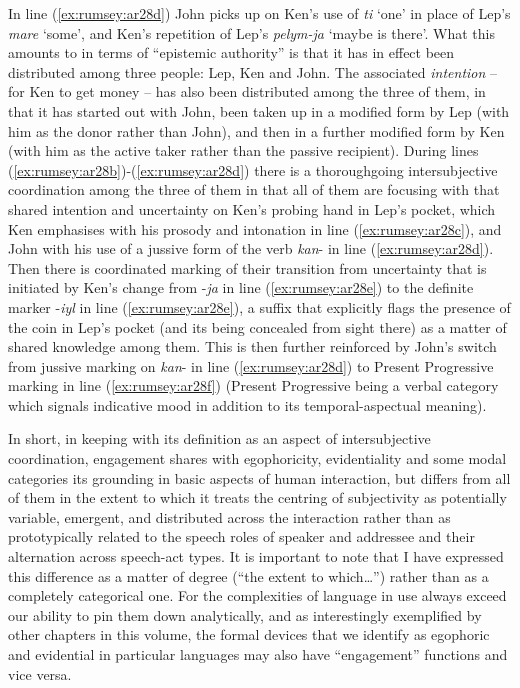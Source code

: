 \documentclass[output=paper]{langsci/langscibook}
\begin{document}
In line (\ref{ex:rumsey:ar28d}) John picks up on Ken’s use of \textit{ti} ‘one’ in place of Lep’s \textit{mare} ‘some’, and Ken’s repetition of Lep’s \textit{pelym-ja} ‘maybe is there’. What this amounts to in terms of “epistemic authority” is that it has in effect been distributed among three people:  Lep, Ken and John. The associated \textit{intention}  – for Ken to get money – has also been distributed among the three of them, in that it has started out with John, been taken up in a modified form by Lep (with him as the donor rather than John), and then in a further modified form by Ken (with him as the active taker rather than the passive recipient). During lines (\ref{ex:rumsey:ar28b})-(\ref{ex:rumsey:ar28d}) there is a thoroughgoing  intersubjective coordination among the three of them in that all of them are focusing with that shared intention and uncertainty on Ken’s probing hand in Lep’s pocket, which Ken emphasises with his prosody and intonation in line (\ref{ex:rumsey:ar28c}), and John with his use of a jussive form of the verb \textit{kan}- in line (\ref{ex:rumsey:ar28d}). Then there is coordinated marking of their transition from uncertainty that is initiated by Ken’s change from -\textit{ja} in line (\ref{ex:rumsey:ar28e}) to the definite marker -\textit{iyl} in line (\ref{ex:rumsey:ar28e}),  a suffix that explicitly flags the presence of the coin in Lep’s pocket (and its being concealed from sight there) as a matter of shared knowledge among them. This is then further reinforced by John’s switch from jussive marking on \textit{kan}- in line (\ref{ex:rumsey:ar28d}) to Present Progressive marking in line (\ref{ex:rumsey:ar28f})  (Present Progressive being a verbal category which signals indicative mood in addition to its temporal-aspectual meaning).

In short, in keeping with its definition as an aspect of intersubjective coordination, engagement shares with egophoricity, evidentiality and some modal categories its grounding in basic aspects of human interaction, but differs from all of them in the extent to which it treats the centring of subjectivity as potentially variable, emergent,  and distributed across the interaction rather than as prototypically related to the speech roles of speaker and addressee and their alternation across speech-act types. It is important to note that I have expressed this difference as a matter of degree (“the extent to which…”) rather than as a completely categorical one. For the complexities of language in use always exceed our ability to pin them down analytically, and as interestingly exemplified by other chapters in this volume, the formal devices that we identify as egophoric and evidential in particular languages may also have “engagement” functions and vice versa.
\end{document}
